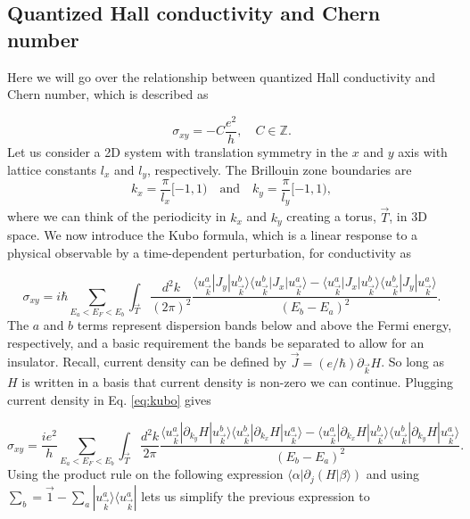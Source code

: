 \subsection{Quantized Hall conductivity and Chern number}

Here we will go over the relationship between quantized Hall conductivity and Chern number, which is described as

\begin{equation}
  \sigma_{xy} = - C\dfrac{e^2}{h}, \quad C \in \mathbb{Z}.
\end{equation}
Let us consider a 2D system with translation symmetry in the $x$ and $y$ axis with lattice constants $l_x$ and $l_y$, respectively.
The Brillouin zone boundaries are
\begin{equation}
  k_x = \dfrac{\pi}{l_x} [-1,1) \quad \text{and} \quad k_y = \dfrac{\pi}{l_y} [-1,1),
\end{equation}
where we can think of the periodicity in $k_x$ and $k_y$ creating a torus, $\vec{T}$, in 3D space.
We now introduce the Kubo formula, which is a linear response to a physical observable by a time-dependent perturbation, for conductivity as

\begin{equation} \label{eq:kubo}
  \sigma_{xy} = i\hbar \sum_{E_a < E_F < E_b} \int_{\vec{T}} \dfrac{d^2k}{(2\pi)^2} \dfrac{\langle u_{\vec{k}}^a | J_y | u_{\vec{k}}^b \rangle \langle u_{\vec{k}}^b | J_x | u_{\vec{k}}^a \rangle - \langle u_{\vec{k}}^a | J_x | u_{\vec{k}}^b \rangle \langle u_{\vec{k}}^b | J_y | u_{\vec{k}}^a \rangle}{{(E_b - E_a)}^2}.
\end{equation}
The $a$ and $b$ terms represent dispersion bands below and above the Fermi energy, respectively, and a basic requirement the bands be separated to allow for an insulator.
Recall, current density can be defined by $\vec{J} = (e/\hbar) \partial_{\vec{k}} H$.
So long as $H$ is written in a basis that current density is non-zero we can continue.
Plugging current density in Eq. \eqref{eq:kubo} gives

\begin{equation}
  \sigma_{xy} = \dfrac{ie^2}{h} \sum_{E_a < E_F < E_b} \int_{\vec{T}} \dfrac{d^2k}{2\pi} \dfrac{\langle u_{\vec{k}}^a | \partial_{k_y} H | u_{\vec{k}}^b \rangle \langle u_{\vec{k}}^b | \partial_{k_x} H | u_{\vec{k}}^a \rangle - \langle u_{\vec{k}}^a | \partial_{k_x} H | u_{\vec{k}}^b \rangle \langle u_{\vec{k}}^b | \partial_{k_y} H | u_{\vec{k}}^a \rangle}{{(E_b - E_a)}^2}.
\end{equation}
Using the product rule on the following expression $\langle \alpha | \partial_j (H | \beta\rangle)$ and using $\sum_b = \vec{1} - \sum_a |u_{\vec{k}}^a\rangle \langle u_{\vec{k}}^a |$ lets us simplify the previous expression to

